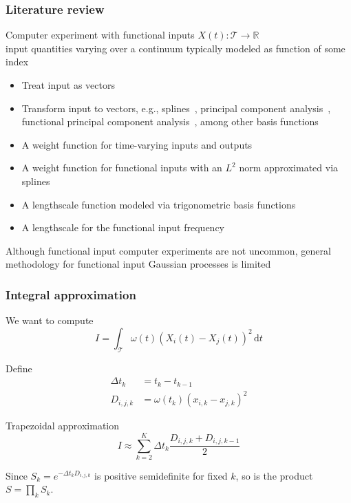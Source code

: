 \documentclass{snedecorbeamer}
\begin{document}
\begin{frame}%
  \label{frm:litrev}
  \frametitle{Literature review}

  Computer experiment with functional inputs $X(t):
  \mathcal{T}\to\mathbb{R}$ \\
  input quantities varying over a continuum typically modeled as function of
  some index

  \begin{itemize}
  \item Treat input as vectors~\cite{iooss2009}
  \item Transform input to vectors, e.g.,
    splines~\cite{betancourt2020,betancourt2020a}, principal component
    analysis~\cite{nanty2016}, functional principal component
    analysis~\cite{wang2017,wang2019}, among other basis
    functions~\cite{tan2019,li2021,striegel2022}
  \item A weight function for time-varying inputs and outputs~\cite{morris2012}
  \item A weight function for functional inputs with an $L^2$ norm approximated
    via splines~\cite{muehlenstaedt2017}
  \item A lengthscale function modeled via trigonometric basis
    functions~\cite{kuttubekova2019}
  \item A lengthscale for the functional input frequency~\cite{Chen2021}
  \end{itemize}

  \vfill{}
  Although functional input computer experiments are not uncommon,
  general methodology for functional input Gaussian processes is limited
\end{frame}

\begin{frame}
  \frametitle{Integral approximation}

  We want to compute
  \begin{equation}
    I = \int_\mathcal{T}\omega(t){(X_i(t) - X_j(t))}^2\,\mathrm{d}t
  \end{equation}

  Define
  \begin{align}
    \Delta t_k
    &= t_{k} - t_{k - 1} \\
    D_{i,j,k}
    &= \omega(t_{k}) {\left(x_{i, k} - x_{j, k}\right)}^2
  \end{align}

  Trapezoidal approximation
  \begin{equation}
    I\approx
    \sum_{k = 2}^{K}
    \Delta t_k
    \frac{D_{i, j, k} + D_{i, j, k - 1}}{2}
  \end{equation}

  Since
  $S_k = e^{-\Delta t_k D_{i, j, k}}$ is positive semidefinite for fixed $k$, so
  is the product $S = \prod_{k} S_k$.

\end{frame}
\end{document}
